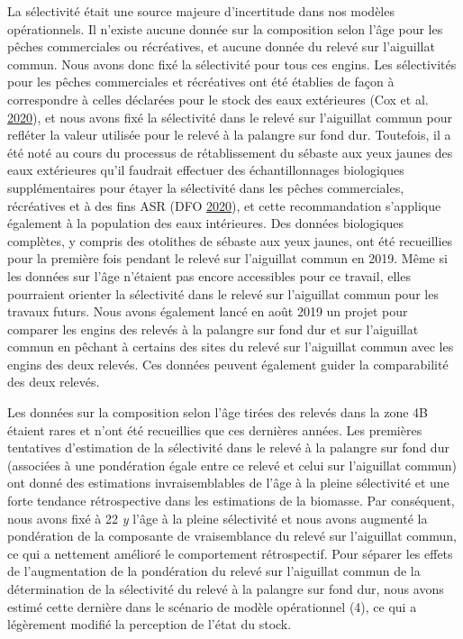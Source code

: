 \documentclass[11pt]{book}
\begin{document}
La sélectivité était une source majeure d'incertitude dans nos modèles opérationnels. Il n'existe aucune donnée sur la composition selon l'âge pour les pêches commerciales ou récréatives, et aucune donnée du relevé sur l'aiguillat commun. Nous avons donc fixé la sélectivité pour tous ces engins. Les sélectivités pour les pêches commerciales et récréatives ont été établies de façon à correspondre à celles déclarées pour le stock des eaux extérieures (Cox et al. \protect\hyperlink{ref-cox2020}{2020}), et nous avons fixé la sélectivité dans le relevé sur l'aiguillat commun pour refléter la valeur utilisée pour le relevé à la palangre sur fond dur. Toutefois, il a été noté au cours du processus de rétablissement du sébaste aux yeux jaunes des eaux extérieures qu'il faudrait effectuer des échantillonnages biologiques supplémentaires pour étayer la sélectivité dans les pêches commerciales, récréatives et à des fins ASR (DFO \protect\hyperlink{ref-dfo2020}{2020}), et cette recommandation s'applique également à la population des eaux intérieures. Des données biologiques complètes, y compris des otolithes de sébaste aux yeux jaunes, ont été recueillies pour la première fois pendant le relevé sur l'aiguillat commun en 2019. Même si les données sur l'âge n'étaient pas encore accessibles pour ce travail, elles pourraient orienter la sélectivité dans le relevé sur l'aiguillat commun pour les travaux futurs. Nous avons également lancé en août 2019 un projet pour comparer les engins des relevés à la palangre sur fond dur et sur l'aiguillat commun en pêchant à certains des sites du relevé sur l'aiguillat commun avec les engins des deux relevés. Ces données peuvent également guider la comparabilité des deux relevés.

Les données sur la composition selon l'âge tirées des relevés dans la zone 4B étaient rares et n'ont été recueillies que ces dernières années. Les premières tentatives d'estimation de la sélectivité dans le relevé à la palangre sur fond dur (associées à une pondération égale entre ce relevé et celui sur l'aiguillat commun) ont donné des estimations invraisemblables de l'âge à la pleine sélectivité et une forte tendance rétrospective dans les estimations de la biomasse. Par conséquent, nous avons fixé à 22 \emph{y} l'âge à la pleine sélectivité et nous avons augmenté la pondération de la composante de vraisemblance du relevé sur l'aiguillat commun, ce qui a nettement amélioré le comportement rétrospectif. Pour séparer les effets de l'augmentation de la pondération du relevé sur l'aiguillat commun de la détermination de la sélectivité du relevé à la palangre sur fond dur, nous avons estimé cette dernière dans le scénario de modèle opérationnel (4), ce qui a légèrement modifié la perception de l'état du stock.
\end{document}
